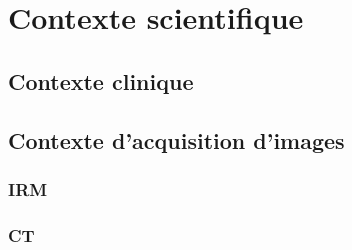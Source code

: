 %

\chapter{Contexte scientifique}
\label{sec:contexte}


\section{Contexte clinique}
\label{sec:contexte:clinique}

\section{Contexte d'acquisition d'images}
\label{sec:contexte:images}

\subsection{IRM}
\label{sec:contexte:images:irm}

\subsection{CT}
\label{sec:contexte:images:CT}